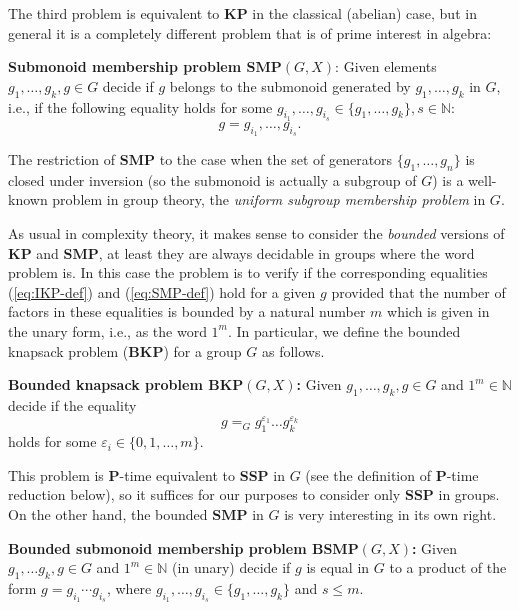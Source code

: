 \documentclass[10pt]{amsart}
\theoremstyle{definition}
\def\P{{\mathbf{P}}}
\def\SSP{{\mathbf{SSP}}}
\def\SMP{{\mathbf{SMP}}}
\def\BSMP{{\mathbf{BSMP}}}
\def\BKP{{\mathbf{BKP}}}
\def\KP{{\mathbf{KP}}}
\begin{document}
The third problem is equivalent to $\KP$ in the classical (abelian) case, but in general it is a completely different problem that is of prime  interest in algebra:

\medskip
\noindent
{\bf Submonoid membership problem $\mathbf{SMP}(G,X)$\index{$\SMP(G,X)$}}:  Given elements $g_1,\ldots,g_k,g\in G$
decide if $g$ belongs to the submonoid generated by $g_1, \ldots, g_k$ in $G$, i.e., if the following equality holds for some $g_{i_1}, \ldots, g_{i_s} \in \{g_1, \ldots, g_k\}, s \in \mathbb{N}$:
\begin{equation}\label{eq:SMP-def}
g = g_{i_1}, \ldots, g_{i_s}.
\end{equation}

\medskip
The restriction of $\SMP$ to the case when the set of generators $\{g_1, \ldots,g_n\}$ is closed under inversion (so the submonoid is actually a subgroup of $G$) is  a well-known problem in group theory, the {\em uniform subgroup membership problem} in $G$.

As usual in complexity theory, it makes sense to consider the {\em bounded} versions of $\KP$ and $\SMP$, at least they are always decidable in groups where the word problem is. In this case the problem is to verify  if the corresponding equalities (\ref{eq:IKP-def}) and  (\ref{eq:SMP-def}) hold for a given $g$ provided that the number of factors in these equalities  is bounded by a natural number $m$ which is given in the unary form, i.e., as the word $1^m$. In particular, we define the bounded knapsack problem ($\BKP$) for a group $G$ as follows.

\medskip \noindent
{\bf Bounded knapsack problem $\BKP(G,X)$\index{$\BKP(G,X)$}:}
Given $g_1,\ldots,g_k,g\in G$ and $1^m\in\mathbb N$ decide if the equality
$$ %
g =_G g_1^{\varepsilon_1} \ldots g_k^{\varepsilon_k}
$$ holds for some $\varepsilon_i \in \{0,1, \ldots, m \}$.

This problem  is  $\P$-time equivalent to  $\SSP$ in $G$ (see the definition of $\P$-time reduction below), so it suffices for our purposes to consider only $\SSP$ in groups.
On the other hand,  the bounded $\SMP$ in $G$ is very interesting in its own right.


\medskip \noindent
{\bf Bounded submonoid membership problem $\BSMP(G,X)$\index{$\BSMP(G,X)$}:}
Given $g_1, \ldots g_k, g \in G$ and $1^m \in \mathbb{N}$ (in unary)
decide if $g$ is equal in $G$ to a product of the form
$g=g_{i_1}\cdots g_{i_s}$, where $g_{i_1}, \ldots, g_{i_s} \in \{g_1, \ldots, g_k\}$ and  $s\le m$.
\end{document}
